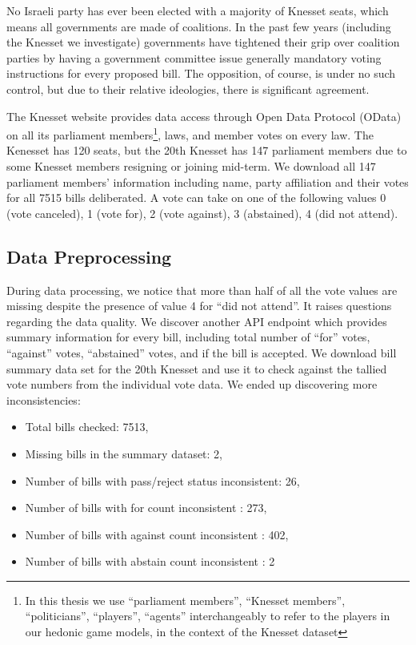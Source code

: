 No Israeli party has ever been elected with a majority of Knesset seats,
which means all governments are made of coalitions.
In the past few years (including the Knesset we investigate)
governments have tightened their grip over coalition parties by having a government committee issue generally mandatory
voting instructions for every proposed bill.
The opposition, of course, is under no such control,
but due to their relative ideologies, there is significant agreement.

The Knesset website provides data access through Open Data Protocol (OData)
on all its parliament members\footnote{In this thesis we use ``parliament members'',
``Knesset members'', ``politicians'', ``players'', ``agents'' interchangeably to refer
to the players in our hedonic game models, in the context of the Knesset dataset},
laws, and member votes on every law.
The Kenesset has 120 seats, but the 20th Knesset has 147 parliament members
due to some Knesset members resigning or joining mid-term.
We download all 147 parliament members' information including name,
party affiliation and their votes for all 7515 bills deliberated.
A vote can take on one of the following values
0 (vote canceled), 1 (vote for), 2 (vote against),
3 (abstained), 4 (did not attend).

\subsection{Data Preprocessing}
\label{subsec:data_preprocessing}

During data processing, we notice that more than half of all the vote values
are missing despite the presence of value 4 for ``did not attend''.
It raises questions regarding the data quality.
We discover another API endpoint which provides summary information for
every bill, including total number of ``for'' votes, ``against'' votes,
``abstained'' votes, and if the bill is accepted.
We download bill summary data set for the 20th Knesset and use it
to check against the tallied vote numbers from the individual vote data.
We ended up discovering more inconsistencies:

\begin{itemize}
  \item Total bills checked: 7513,
  \item Missing bills in the summary dataset: 2,
  \item Number of bills with pass/reject status inconsistent: 26,
  \item Number of bills with for count inconsistent : 273,
  \item Number of bills with against count inconsistent : 402,
  \item Number of bills with abstain count inconsistent : 2
\end{itemize}

